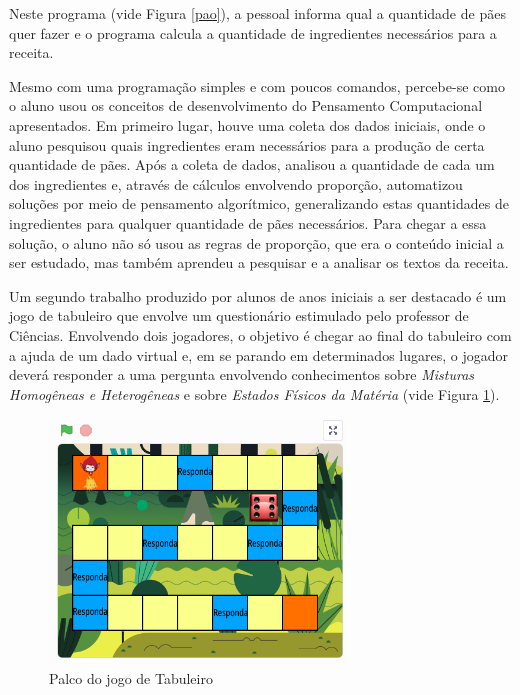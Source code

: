\documentclass[12pt, openright, a4paper, brazil, english, french, spanish, bibjustif, openany, oneside]{abntex2}
\begin{document}
Neste programa (vide Figura \ref{pao}), a pessoal informa qual a quantidade de pães quer fazer e o programa calcula a quantidade de ingredientes necessários para a receita. 

Mesmo com uma programação simples e com poucos comandos, percebe-se como o aluno usou os conceitos de desenvolvimento do Pensamento Computacional apresentados. Em primeiro lugar, houve uma coleta dos dados iniciais, onde o aluno pesquisou quais ingredientes eram necessários para a produção de certa quantidade de pães. Após a coleta de dados, analisou a quantidade de cada um dos ingredientes e, através de cálculos envolvendo proporção, automatizou soluções por meio de pensamento algorítmico, generalizando estas quantidades de ingredientes para qualquer quantidade de pães necessários. Para chegar a essa solução, o aluno não só usou as regras de proporção, que era o conteúdo inicial a ser estudado, mas também aprendeu a pesquisar e a analisar os textos da receita.

Um segundo trabalho produzido por alunos de anos iniciais a ser destacado é um jogo de tabuleiro que envolve um questionário estimulado pelo professor de Ciências. Envolvendo dois jogadores, o objetivo é chegar ao final do tabuleiro com a ajuda de um dado virtual e, em se parando em determinados lugares, o jogador deverá responder a uma pergunta envolvendo conhecimentos sobre \textit{Misturas Homogêneas e Heterogêneas} e sobre \textit{Estados Físicos da Matéria} (vide Figura \ref{tabule}).

\begin{figure}[H]

 \centering
 
     \caption{Palco do jogo de Tabuleiro \label{tabule}}
     \includegraphics[height=6.5cm]{palcotabuleiro.png}
       
    
\end{figure}
\end{document}

